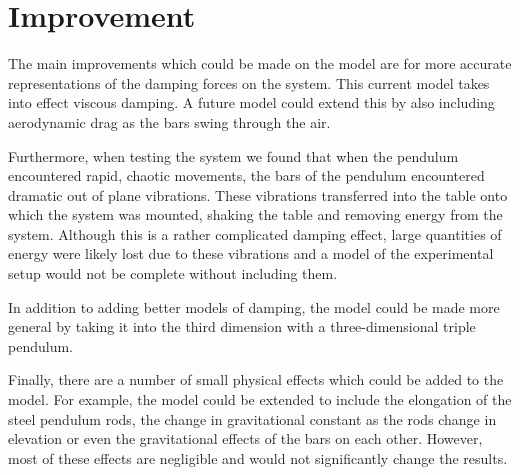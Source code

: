 \section{Improvement}
The main improvements which could be made on the model are for more accurate representations of the damping forces on the system.  This current model takes into effect viscous damping.  A future model could extend this by also including aerodynamic drag as the bars swing through the air.

Furthermore, when testing the system we found that when the pendulum encountered rapid, chaotic movements, the bars of the pendulum encountered dramatic out of plane vibrations.  These vibrations transferred into the table onto which the system was mounted, shaking the table and removing energy from the system.  Although this is a rather complicated damping effect, large quantities of energy were likely lost due to these vibrations and a model of the experimental setup would not be complete without including them.

In addition to adding better models of damping, the model could be made more general by taking it into the third dimension with a three-dimensional triple pendulum.

Finally, there are a number of small physical effects which could be added to the model.  For example, the model could be extended to include the elongation of the steel pendulum rods, the change in gravitational constant as the rods change in elevation or even the gravitational effects of the bars on each other.  However, most of these effects are negligible and would not significantly change the results.
